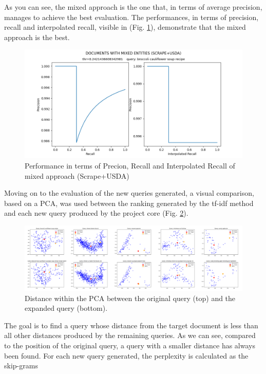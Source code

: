 As you can see, the mixed approach is the one that, in 
terms of average precision, manages to achieve the best evaluation. The 
performances, in terms of precision, recall and interpolated recall, visible in 
(Fig. \ref{Performance mixed approach}), demonstrate that the mixed approach is the best. 
\begin{figure}[h!]
    \centering
    \includegraphics[width =\linewidth]{images/11 keras/11 DOCUMENTS WITH MIXED ENTITIES (SCRAPE+USDA).png}
    \centering
    \caption{Performance in terms of Precion, Recall and Interpolated Recall of mixed approach (Scrape+USDA)}
    \label{Performance mixed approach}
\end{figure}
Moving 
on to the evaluation of the new queries generated, a visual comparison, based 
on a PCA, was used between the ranking generated by the tf-idf method and 
each new query produced by the project core (Fig. \ref{PCA}). 
\begin{figure}[h!]
    \centering
    \includegraphics[width =\linewidth]{images/PCA paper/PCA all.png}
    \centering
    \caption{Distance within the PCA between the original query (top) and the expanded query (bottom).}
    \label{PCA}
\end{figure}
The goal is to find a query 
whose distance from the target document is less than all other distances 
produced by the remaining queries. As we can see, compared to the position 
of the original query, a query with a smaller distance has always been found.
For each new query generated, the perplexity is calculated as the skip-grams 
